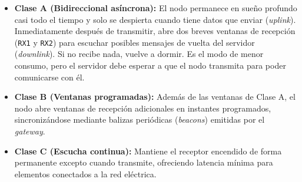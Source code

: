 \documentclass[../main.tex]{subfiles}
\begin{document}
                \begin{itemize}
                    \item \textbf{Clase A (Bidireccional asíncrona):} El nodo permanece en sueño profundo casi todo el tiempo y solo se despierta cuando tiene datos que enviar (\emph{uplink}). Inmediatamente después de transmitir, abre dos breves ventanas de recepción (\texttt{RX1} y \texttt{RX2}) para escuchar posibles mensajes de vuelta del servidor (\emph{downlink}). Si no recibe nada, vuelve a dormir. Es el modo de menor consumo, pero el servidor debe esperar a que el nodo transmita para poder comunicarse con él.
                    \item \textbf{Clase B (Ventanas programadas):} Además de las ventanas de Clase A, el nodo abre ventanas de recepción adicionales en instantes programados, sincronizándose mediante balizas periódicas (\emph{beacons}) emitidas por el \emph{gateway}.
                    \item \textbf{Clase C (Escucha continua):} Mantiene el receptor encendido de forma permanente excepto cuando transmite, ofreciendo latencia mínima para elementos conectados a la red eléctrica.
                \end{itemize}
\end{document}

